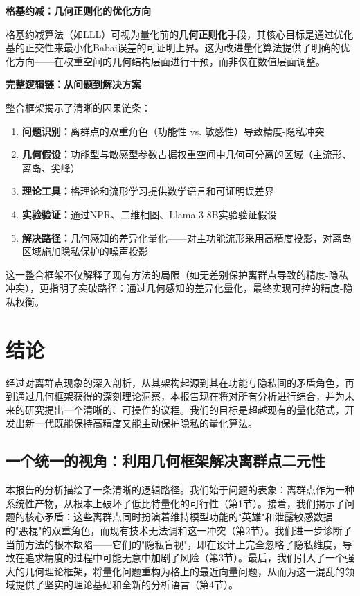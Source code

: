 \documentclass[letterpaper,twocolumn,10pt]{article}
\begin{document}
\textbf{格基约减：几何正则化的优化方向}

格基约减算法（如LLL）可视为量化前的\textbf{几何正则化}手段，其核心目标是通过优化基的正交性来最小化Babai误差的可证明上界。这为改进量化算法提供了明确的优化方向——在权重空间的几何结构层面进行干预，而非仅在数值层面调整。

\textbf{完整逻辑链：从问题到解决方案}

整合框架揭示了清晰的因果链条：

\begin{enumerate}
\item \textbf{问题识别：}离群点的双重角色（功能性 vs. 敏感性）导致精度-隐私冲突
\item \textbf{几何假设：}功能型与敏感型参数占据权重空间中几何可分离的区域（主流形、离岛、尖峰）
\item \textbf{理论工具：}格理论和流形学习提供数学语言和可证明误差界
\item \textbf{实验验证：}通过NPR、二维相图、Llama-3-8B实验验证假设
\item \textbf{解决路径：}几何感知的差异化量化——对主功能流形采用高精度投影，对离岛区域施加隐私保护的噪声投影
\end{enumerate}

这一整合框架不仅解释了现有方法的局限（如无差别保护离群点导致的精度-隐私冲突），更指明了突破路径：通过几何感知的差异化量化，最终实现可控的精度-隐私权衡。

\section{结论}

经过对离群点现象的深入剖析，从其架构起源到其在功能与隐私间的矛盾角色，再到通过几何框架获得的深刻理论洞察，本报告现在将对所有分析进行综合，并为未来的研究提出一个清晰的、可操作的议程。我们的目标是超越现有的量化范式，开发出新一代既能保持高精度又能主动保护隐私的量化算法。

\subsection{一个统一的视角：利用几何框架解决离群点二元性}

本报告的分析描绘了一条清晰的逻辑路径。我们始于问题的表象：离群点作为一种系统性产物，从根本上破坏了低比特量化的可行性（第1节）。接着，我们揭示了问题的核心矛盾：这些离群点同时扮演着维持模型功能的"英雄"和泄露敏感数据的"恶棍"的双重角色，而现有技术无法调和这一冲突（第2节）。我们进一步诊断了当前方法的根本缺陷——它们的"隐私盲视"，即在设计上完全忽略了隐私维度，导致在追求精度的过程中可能无意中加剧了风险（第3节）。最后，我们引入了一个强大的几何理论框架，将量化问题重构为格上的最近向量问题，从而为这一混乱的领域提供了坚实的理论基础和全新的分析语言（第4节）。
\end{document}
